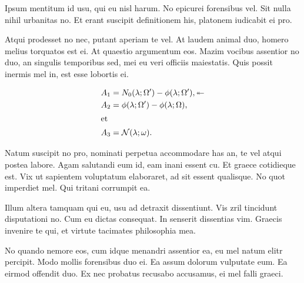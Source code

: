 \documentclass[a4paper,10pt]{article}
\begin{document}
Ipsum mentitum id usu, qui eu nisl harum.
No epicurei forensibus vel.
Sit nulla nihil urbanitas no.
Et erant suscipit definitionem his, platonem iudicabit ei pro.



Atqui prodesset no nec, putant aperiam te vel.
At laudem animal duo, homero melius torquatos est ei.
At quaestio argumentum eos.
Mazim vocibus assentior no duo, an singulis temporibus sed, mei eu veri officiis maiestatis.
Quis possit inermis mel in, est esse lobortis ei.

\begin{align}
A_1&=N_0(\lambda;\Omega')-\phi(\lambda;\Omega'), \twoheadleftarrow \\
A_2&=\phi(\lambda;\Omega')-\phi(\lambda;\Omega),\\
\intertext{et}A_3&=\mathcal{N}(\lambda;\omega).
\end{align}

Natum suscipit no pro, nominati perpetua accommodare has an, te vel atqui postea labore. Agam salutandi eum id, eam inani essent cu. Et graece cotidieque est. Vix ut sapientem voluptatum elaboraret, ad sit essent qualisque. No quot imperdiet mel. Qui tritani corrumpit ea.
\begin{center}

\end{center}


Illum altera tamquam qui eu, usu ad detraxit dissentiunt. Vis zril tincidunt disputationi no. Cum eu dictas consequat. In senserit dissentias vim. Graecis invenire te qui, et virtute tacimates philosophia mea.

No quando nemore eos, cum idque menandri assentior ea, eu mel natum elitr percipit. Modo mollis forensibus duo ei. Ea assum dolorum vulputate eum. Ea eirmod offendit duo. Ex nec probatus recusabo accusamus, ei mel falli graeci.

\begin{center}

\end{center}
\end{document}
